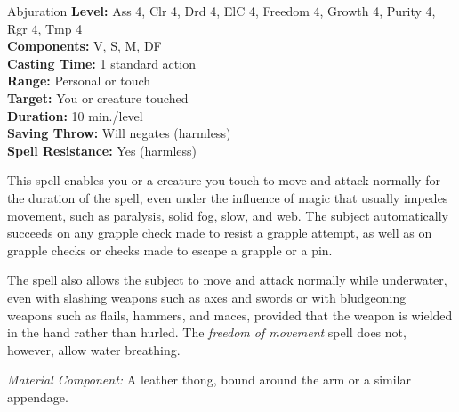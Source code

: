 {Abjuration}
{
	\textbf{Level:}
	Ass 4, Clr 4, Drd 4, ElC 4, Freedom 4, Growth 4, Purity 4, Rgr 4, Tmp 4\\
	\textbf{Components:}
	V, S, M, DF\\
	\textbf{Casting Time:}
	1 standard action\\
	\textbf{Range:}
	Personal or touch\\
	\textbf{Target:}
	You or creature touched\\
	\textbf{Duration:}
	10 min./level\\
	\textbf{Saving Throw:}
	Will negates (harmless)\\
	\textbf{Spell Resistance:}
	Yes (harmless)\\
}
{
	This spell enables you or a creature you touch to move and attack normally for the duration of the spell, even under the influence of magic that usually impedes movement, such as paralysis, solid fog, slow, and web. The subject automatically succeeds on any grapple check made to resist a grapple attempt, as well as on grapple checks or  checks made to escape a grapple or a pin.

	The spell also allows the subject to move and attack normally while underwater, even with slashing weapons such as axes and swords or with bludgeoning weapons such as flails, hammers, and maces, provided that the weapon is wielded in the hand rather than hurled. The \emph{freedom of movement} spell does not, however, allow water breathing.

	\textit{Material Component:}
	A leather thong, bound around the arm or a similar appendage.

}
